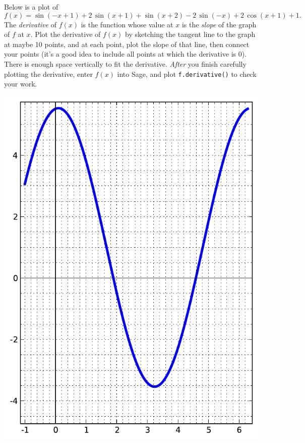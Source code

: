 Below is a plot of $$f(x)=\sin\left(-x + 1\right) + 2 \, \sin\left(x + 1\right) + \sin\left(x + 2\right) - 2 \, \sin\left(-x\right) + 2 \, \cos\left(x + 1\right) + 1.$$  The {\em \color{red}derivative} of $f(x)$ is the function whose value at $x$ is the {\em slope} of the graph of $f$ at $x$.  Plot the derivative of $f(x)$ by sketching the tangent line to the graph at maybe 10 points, and at each point, plot the slope of that line, then connect your points (it's a good idea to include all points at which the derivative is 0).  There is enough space vertically to fit the derivative.  {\em After} you finish carefully plotting the derivative, enter $f(x)$ into Sage, and plot {\color{blue}\verb|f.derivative()|} to check your work.
\begin{center}\includegraphics{functions/24.pdf}\end{center}\newpage

